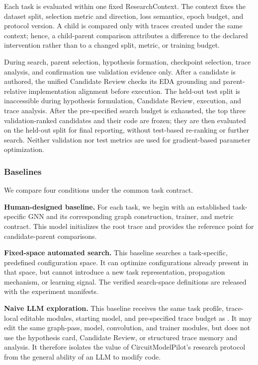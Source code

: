 Each task is evaluated within one fixed ResearchContext. The context fixes the dataset split, selection metric and direction, loss semantics, epoch budget, and protocol version. A child is compared only with traces created under the same context; hence, a child-parent comparison attributes a difference to the declared intervention rather than to a changed split, metric, or training budget.

During search, parent selection, hypothesis formation, checkpoint selection, trace analysis, and confirmation use validation evidence only. After a candidate is authored, the unified Candidate Review checks its EDA grounding and parent-relative implementation alignment before execution. The held-out test split is inaccessible during hypothesis formulation, Candidate Review, execution, and trace analysis. After the pre-specified search budget is exhausted, the top three validation-ranked candidates and their code are frozen; they are then evaluated on the held-out split for final reporting, without test-based re-ranking or further search. Neither validation nor test metrics are used for gradient-based parameter optimization.

\subsubsection{Baselines}
\label{sec:exp_baselines}

We compare four conditions under the common task contract.

\noindent\textbf{Human-designed baseline.} For each task, we begin with an established task-specific GNN and its corresponding graph construction, trainer, and metric contract. This model initializes the root trace and provides the reference point for candidate-parent comparisons.

\noindent\textbf{Fixed-space automated search.} This baseline searches a task-specific, predefined configuration space. It can optimize configurations already present in that space, but cannot introduce a new task representation, propagation mechanism, or learning signal. The verified search-space definitions are released with the experiment manifests.

\noindent\textbf{Naive LLM exploration.} This baseline receives the same task profile, trace-local editable modules, starting model, and pre-specified trace budget as \sysname. It may edit the same graph-pass, model, convolution, and trainer modules, but does not use the hypothesis card, Candidate Review, or structured trace memory and analysis. It therefore isolates the value of CircuitModelPilot's research protocol from the general ability of an LLM to modify code.

